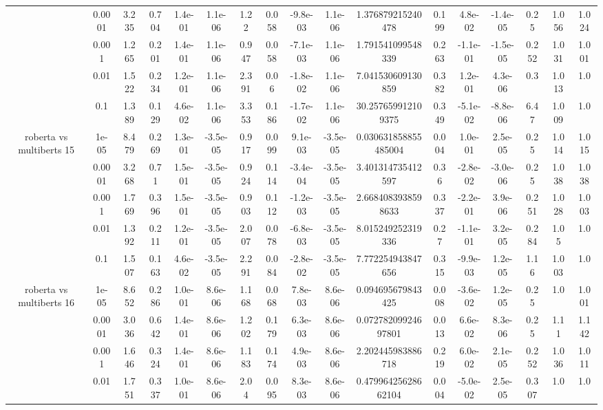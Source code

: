 \begin{tabular}{|c|c|c|c|c|c|c|c|c|c|c|c|c|c|c|c|c|}
 & 0.0001 & 3.235 & 0.704 & 1.4e-01 & 1.1e-06 & 1.22 & 0.058 & -9.8e-03 & 1.1e-06 & 1.376879215240478 & 0.199 & 4.8e-02 & -1.4e-05 & 0.25 & 1.056 & 1.024 \\
 & 0.001 & 1.265 & 0.201 & 1.4e-01 & 1.1e-06 & 0.947 & 0.058 & -7.1e-03 & 1.1e-06 & 1.791541099548339 & 0.263 & -1.1e-01 & -1.5e-05 & 0.252 & 1.031 & 1.001 \\
 & 0.01 & 1.522 & 0.234 & 1.2e-01 & 1.1e-06 & 2.391 & 0.06 & -1.8e-02 & 1.1e-06 & 7.041530609130859 & 0.382 & 1.2e-01 & 4.3e-06 & 0.3 & 1.013 & 1.0 \\
 & 0.1 & 1.389 & 0.129 & 4.6e-02 & 1.1e-06 & 3.353 & 0.186 & -1.7e-02 & 1.1e-06 & 30.257659912109375 & 0.349 & -5.1e-02 & -8.8e-06 & 6.47 & 1.009 & 1.0 \\
\hline
\multirow{5}{*}{roberta  vs multiberts 15} & 1e-05 & 8.479 & 0.269 & 1.3e-01 & -3.5e-05 & 0.917 & 0.099 & 9.1e-03 & -3.5e-05 & 0.030631858855485004 & 0.004 & 1.0e-01 & 2.5e-05 & 0.25 & 1.014 & 1.015 \\
 & 0.0001 & 3.268 & 0.71 & 1.5e-01 & -3.5e-05 & 0.924 & 0.114 & -3.4e-04 & -3.5e-05 & 3.401314735412597 & 0.36 & -2.8e-02 & -3.0e-06 & 0.25 & 1.038 & 1.038 \\
 & 0.001 & 1.769 & 0.396 & 1.5e-01 & -3.5e-05 & 0.903 & 0.112 & -1.2e-03 & -3.5e-05 & 2.6684083938598633 & 0.337 & -2.2e-01 & 3.9e-06 & 0.251 & 1.028 & 1.003 \\
 & 0.01 & 1.392 & 0.211 & 1.2e-01 & -3.5e-05 & 2.007 & 0.078 & -6.8e-03 & -3.5e-05 & 8.015249252319336 & 0.27 & -1.1e-01 & 3.2e-05 & 0.284 & 1.05 & 1.0 \\
 & 0.1 & 1.507 & 0.163 & 4.6e-02 & -3.5e-05 & 2.291 & 0.084 & -2.8e-02 & -3.5e-05 & 7.772254943847656 & 0.315 & -9.9e-03 & 1.2e-05 & 1.16 & 1.003 & 1.0 \\
\hline
\multirow{5}{*}{roberta  vs multiberts 16} & 1e-05 & 8.652 & 0.286 & 1.0e-01 & 8.6e-06 & 1.168 & 0.068 & 7.8e-03 & 8.6e-06 & 0.094695679843425 & 0.008 & -3.6e-02 & 1.2e-05 & 0.25 & 1.0 & 1.001 \\
 & 0.0001 & 3.036 & 0.642 & 1.4e-01 & 8.6e-06 & 1.202 & 0.179 & 6.3e-03 & 8.6e-06 & 0.07278209924697801 & 0.013 & 6.6e-02 & 8.3e-06 & 0.25 & 1.11 & 1.142 \\
 & 0.001 & 1.646 & 0.324 & 1.4e-01 & 8.6e-06 & 1.183 & 0.174 & 4.9e-03 & 8.6e-06 & 2.202445983886718 & 0.219 & 6.0e-02 & 2.1e-05 & 0.252 & 1.036 & 1.011 \\
 & 0.01 & 1.751 & 0.337 & 1.0e-01 & 8.6e-06 & 2.04 & 0.095 & 8.3e-03 & 8.6e-06 & 0.47996425628662104 & 0.004 & -5.0e-02 & 2.5e-05 & 0.307 & 1.0 & 1.0 \\

\end{tabular}
